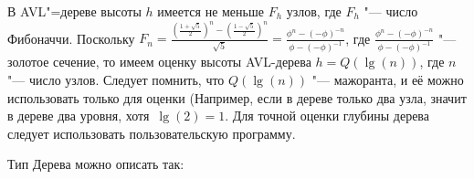 В AVL"=дереве высоты $h$ имеется не меньше $F_h$ узлов, где $F_h$ "--- число Фибоначчи.
Поскольку $F_n = \frac{(\frac{1 + \sqrt{5}}{2})^n - (\frac{1 - \sqrt{5}}{2})^n}{\sqrt{5}} =
\frac{\phi^n - (-\phi)^{-n}}{\phi - (-\phi)^{-1}}$,
где $\frac{\phi^n - (-\phi)^{-n}}{\phi - (-\phi)^{-1}}$ "--- золотое сечение,
то имеем оценку высоты AVL-дерева $h = Q(\lg(n))$,
где $n$ "--- число узлов. Следует помнить, что $Q(\lg(n))$ "--- мажоранта,
и её можно использовать только для оценки
(Например, если в дереве только два узла, значит в дереве два уровня,
хотя $\lg(2) = 1$. Для точной оценки глубины дерева следует использовать пользовательскую программу.


Тип Дерева можно описать так:


